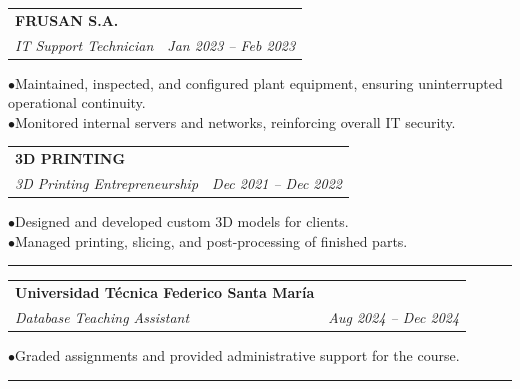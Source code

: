 \documentclass[11pt, a4paper]{article}
\begin{document}
\noindent\begin{tabularx}{\linewidth}{@{}X r@{}}
  \textbf{FRUSAN S.A.} & \\
  \textit{IT Support Technician} & \textit{Jan 2023 -- Feb 2023} \\
\end{tabularx}
\hspace{1em}$\bullet$\enspace Maintained, inspected, and configured plant equipment, ensuring uninterrupted operational continuity. \\
\hspace{1em}$\bullet$\enspace Monitored internal servers and networks, reinforcing overall IT security. \\
\vspace{4pt}

\noindent\begin{tabularx}{\linewidth}{@{}X r@{}}
  \textbf{3D PRINTING} & \\
  \textit{3D Printing Entrepreneurship} & \textit{Dec 2021 -- Dec 2022} \\
\end{tabularx}
\hspace{1em}$\bullet$\enspace Designed and developed custom 3D models for clients. \\
\hspace{1em}$\bullet$\enspace Managed printing, slicing, and post-processing of finished parts. \\
\vspace{4pt}


\vspace{6pt}\vspace{2pt}\hrule\vspace{4pt}

\noindent\begin{tabularx}{\linewidth}{@{}X r@{}}
  \textbf{Universidad Técnica Federico Santa María} & \\
  \textit{Database Teaching Assistant} & \textit{Aug 2024 -- Dec 2024} \\
\end{tabularx}
\hspace{1em}$\bullet$\enspace Graded assignments and provided administrative support for the course. \\
\vspace{4pt}


\vspace{6pt}\vspace{2pt}\hrule\vspace{4pt}
\end{document}

